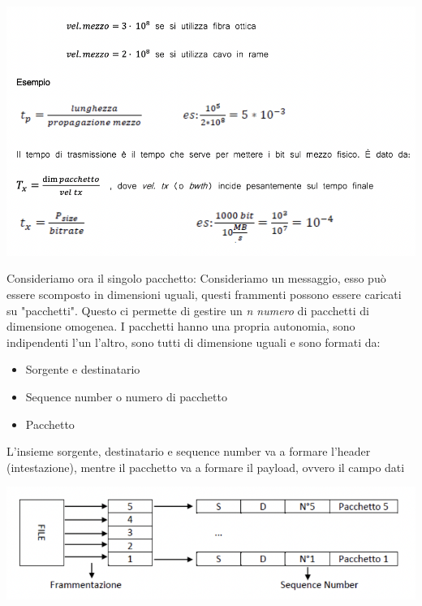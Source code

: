 \documentclass[11pt, oneside]{article}   	%
\begin{document}
\begin{center}
\includegraphics[scale=0.6]{3}
\end{center}

Consideriamo ora il singolo pacchetto:
Consideriamo un messaggio, esso può essere scomposto in dimensioni uguali, questi frammenti possono essere caricati su "pacchetti". Questo ci permette di gestire un \emph{n numero} di pacchetti di dimensione omogenea. 
I pacchetti hanno una propria autonomia, sono indipendenti l'un l'altro, sono tutti di dimensione uguali e sono formati da:
\begin{itemize}
\item Sorgente e destinatario
\item Sequence number o numero di pacchetto
\item Pacchetto
\end{itemize}
L'insieme sorgente, destinatario e sequence number va a formare l'header (intestazione), mentre il pacchetto va a formare il payload, ovvero il campo dati\\
\begin{center}
\includegraphics[scale=0.6]{package}
\end{center}
\end{document}
